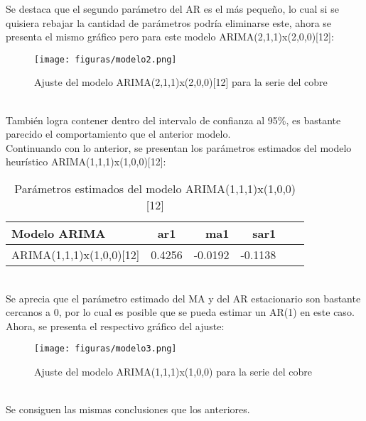 \documentclass{report}
\begin{document}
Se destaca que el segundo parámetro del AR es el más pequeño, lo cual si se quisiera rebajar la cantidad de parámetros podría eliminarse este, ahora se presenta el mismo gráfico pero para este modelo ARIMA(2,1,1)x(2,0,0)[12]:\\

    \begin{figure}[htp]
        \centering
    	\texttt{[image: figuras/modelo2.png]}
    	\caption{Ajuste del modelo ARIMA(2,1,1)x(2,0,0)[12] para la serie del cobre}
    	\label{fig: Figura1}
    \end{figure}\\

También logra contener dentro del intervalo de confianza al 95\%, es bastante parecido el comportamiento que el anterior modelo.\\

Continuando con lo anterior, se presentan los parámetros estimados del modelo heurístico ARIMA(1,1,1)x(1,0,0)[12]:\\

\begin{table}[h!]
  \begin{center}
    \label{tab:table1}
    \begin{tabular}{|l|c|r|r|r|r|} 
      \hline
      \textbf{Modelo ARIMA} & ar1 & ma1 &sar1 \\
      \hline
      ARIMA(1,1,1)x(1,0,0)[12] & 0.4256&  -0.0192  &-0.1138 \\
      \hline
    \end{tabular}
  \end{center}
  \caption{Parámetros estimados del modelo ARIMA(1,1,1)x(1,0,0)[12]}
\end{table}\\

Se aprecia que el parámetro estimado del MA y del AR estacionario son bastante cercanos a 0, por lo cual es posible que se pueda estimar un AR(1) en este caso. Ahora, se presenta el respectivo gráfico del ajuste:\\
\vspace{4cm}

    \begin{figure}[htp]
        \centering
    	\texttt{[image: figuras/modelo3.png]}
    	\caption{Ajuste del modelo ARIMA(1,1,1)x(1,0,0) para la serie del cobre}
    	\label{fig: Figura1}
    \end{figure}\\

Se consiguen las mismas conclusiones que los anteriores.\\
\end{document}
